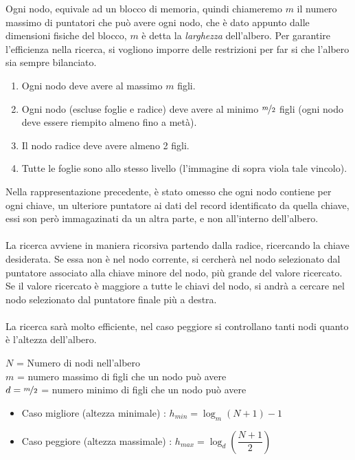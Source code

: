\documentclass[12pt, letterpaper]{article}
\newcommand{\acc}{\\\hphantom{}\\}
\begin{document}
Ogni nodo, equivale ad un blocco di memoria, quindi chiameremo \(m\) il numero massimo di puntatori che può 
avere ogni nodo, che è dato appunto dalle dimensioni fisiche del blocco, \(m\) è detta la \textit{larghezza} 
dell'albero. Per garantire l'efficienza nella ricerca, si vogliono imporre delle restrizioni per far si che 
l'albero sia sempre bilanciato.\begin{enumerate}
    \item Ogni nodo deve avere al massimo \(m\) figli.
    \item Ogni nodo (escluse foglie e radice) deve avere al minimo \(\nicefrac{m}{2}\) figli (ogni nodo deve essere 
    riempito almeno fino a metà).
    \item Il nodo radice deve avere almeno 2 figli.
    \item Tutte le foglie sono allo stesso livello (l'immagine di sopra viola tale vincolo).
\end{enumerate}
Nella rappresentazione precedente, è stato omesso che ogni nodo contiene per ogni chiave, un ulteriore puntatore ai 
dati del record identificato da quella chiave, essi son però immagazinati da un altra parte, e non all'interno dell'albero.\acc 
La ricerca avviene in maniera ricorsiva partendo dalla radice, ricercando la chiave desiderata. Se essa non è 
nel nodo corrente, si cercherà nel nodo selezionato dal puntatore associato alla chiave minore del nodo, più grande del valore ricercato. 
Se il valore ricercato è maggiore a tutte le chiavi del nodo, si andrà a cercare nel nodo selezionato dal puntatore finale più a destra.\acc 
La ricerca sarà molto efficiente, nel caso peggiore si controllano tanti nodi quanto è l'altezza dell'albero.
\begin{center}
    \(N\) = Numero di nodi nell'albero\\ \(m\) = numero massimo di figli che un nodo può avere\\
    \(d=\nicefrac{m}{2}\) =  numero minimo di figli che un nodo può avere
\end{center}
\begin{itemize}
    \item Caso migliore (altezza minimale) : \(h_{min}=\log_m(N+1)-1\)
    \item Caso peggiore (altezza massimale) : \(h_{max}=\log_d(\dfrac{N+1}{2})\)
\end{itemize}\newpage
\end{document}
